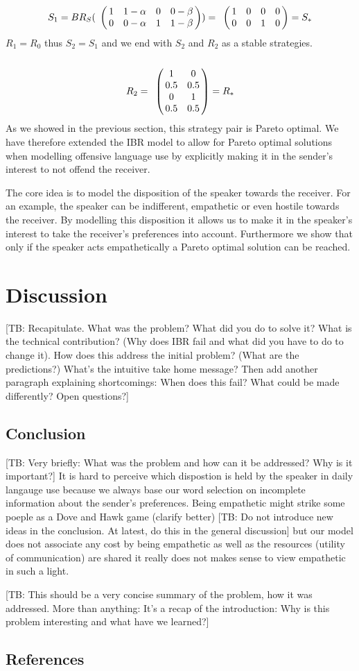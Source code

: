 \documentclass[10pt]{article}
\newcommand{\tb}[1]{\textcolor[rgb]{.8,.33,.0}{[TB: #1]}}%
\begin{document}
\begin{equation*}
S_1=BR_S(
\bordermatrix{
                & & & &    \cr
     &       1 &         1-\alpha & 0       & 0-\beta \cr
     &       0 &         0-\alpha & 1      & 1-\beta
 }
 )
=
\bordermatrix{
                & & & &    \cr
     &       1 &         0 & 0       & 0 \cr
     &       0 &         0 & 1      & 0
 }
 =S_*
 \end{equation*}
$R_1=R_0$ thus $S_2=S_1$ and we end with $S_2$ and $R_2$ as a stable strategies.
\begin{equation*}
  R_2= \bordermatrix{
              &  & \cr
      & 1 & 0 \cr
       & 0.5 & 0.5 \cr
       & 0 & 1 \cr
       & 0.5 & 0.5 \cr
   }
   =R_*
\end{equation*}
As we showed in the previous section, this strategy pair is Pareto optimal. We have therefore extended the IBR model to allow for Pareto optimal solutions when modelling offensive language use by explicitly making it in the sender's interest to not offend the receiver.

The core idea is to model the disposition of the speaker towards the receiver. For an example, the speaker can be indifferent, empathetic or even hostile towards the receiver. By modelling this disposition it allows us to make it in the speaker's interest to take the receiver's preferences into account. Furthermore we show that only if the speaker acts empathetically a Pareto optimal solution can be reached.

\section{Discussion}

\tb{Recapitulate. What was the problem? What did you do to solve it? What is the technical contribution? (Why does IBR fail and what did you have to do to change it). How does this address the initial problem? (What are the predictions?) What's the intuitive take home message? Then add another paragraph explaining shortcomings: When does this fail? What could be made differently? Open questions?}

\subsection{Conclusion}

\tb{Very briefly: What was the problem and how can it be addressed? Why is it important?}
It is hard to perceive which dispostion is held by the speaker in daily langauge use because we always base our word selection on incomplete information about the sender's preferences.
Being empathetic might strike some poeple as a Dove and Hawk game (clarify better) \tb{Do not introduce new ideas in the conclusion. At latest, do this in the general discussion} but our model does not associate any cost by being empathetic as well as the resources (utility of communication) are shared it really does not makes sense to view empathetic in such a light.

\tb{This should be a very concise summary of the problem, how it was addressed. More than anything: It's a recap of the introduction: Why is this problem interesting and what have we learned?}
\subsection{References}
\end{document}

